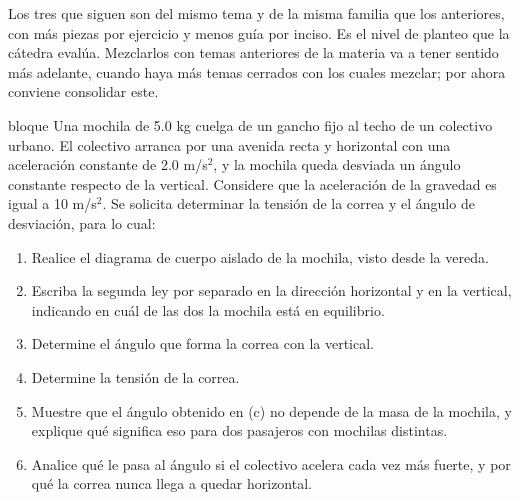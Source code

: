 \documentclass[11pt,openany]{book}
\begin{document}
Los tres que siguen son del mismo tema y de la misma familia que los anteriores, con más piezas por ejercicio y menos guía por inciso. Es el nivel de planteo que la cátedra evalúa. Mezclarlos con temas anteriores de la materia va a tener sentido más adelante, cuando haya más temas cerrados con los cuales mezclar; por ahora conviene consolidar este.

\begin{ejercicio}{bloque}
Una mochila de 5.0 kg cuelga de un gancho fijo al techo de un colectivo urbano. El colectivo arranca por una avenida recta y horizontal con una aceleración constante de 2.0 m/s$^2$, y la mochila queda desviada un ángulo constante respecto de la vertical. Considere que la aceleración de la gravedad es igual a 10 m/s$^2$. Se solicita determinar la tensión de la correa y el ángulo de desviación, para lo cual:
\begin{enumerate}[label=(\alph*), leftmargin=1.7em, itemsep=1pt, topsep=3pt]
  \item Realice el diagrama de cuerpo aislado de la mochila, visto desde la vereda.
  \item Escriba la segunda ley por separado en la dirección horizontal y en la vertical, indicando en cuál de las dos la mochila está en equilibrio.
  \item Determine el ángulo que forma la correa con la vertical.
  \item Determine la tensión de la correa.
  \item Muestre que el ángulo obtenido en (c) no depende de la masa de la mochila, y explique qué significa eso para dos pasajeros con mochilas distintas.
  \item Analice qué le pasa al ángulo si el colectivo acelera cada vez más fuerte, y por qué la correa nunca llega a quedar horizontal.
\end{enumerate}
\end{ejercicio}
\end{document}
